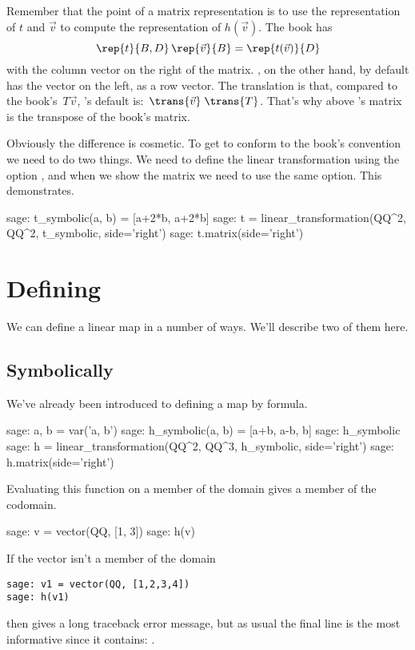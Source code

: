 Remember that the point of a matrix representation is to
use the representation of $t$ and $\vec{v}$ to compute
the representation of $h(\vec{v})$.
The book has
\begin{equation*}
  \rep{t}{B,D}\,\rep{\vec{v}}{B}=\rep{t(\vec{v})}{D}
\end{equation*}
with the column vector on the right of the matrix.
\Sage{}, on the other hand, by default has the vector on the left, as a 
row vector.
The translation is that, compared to the book's~$T\vec{v}$,
\Sage{}'s default is:~$\trans{\vec{v}}\;\trans{T}$.
That's why above \Sage{}'s matrix is the transpose of the book's matrix.

Obviously the difference is cosmetic.
To get \Sage{} to conform to the book's convention we need to do two 
things.
We need to define the linear transformation using the
option , and when we show the
matrix we need to use the same option.
This demonstrates.
\begin{sagecommandline}
sage: t_symbolic(a, b) = [a+2*b, a+2*b]         
sage: t = linear_transformation(QQ^2, QQ^2, t_symbolic, side='right')  
sage: t.matrix(side='right')
\end{sagecommandline}


  

\section{Defining}
We can define a linear map in a number of ways.
We'll describe two of them here.

\subsection{Symbolically}
We've already been introduced to defining a map by formula.
\begin{sagecommandline}
sage: a, b = var('a, b')   
sage: h_symbolic(a, b) = [a+b, a-b, b]         
sage: h_symbolic       
sage: h = linear_transformation(QQ^2, QQ^3, h_symbolic, side='right')
sage: h.matrix(side='right') 
\end{sagecommandline}
Evaluating this function on a member of the domain gives a member
of the codomain. 
\begin{sagecommandline}
sage: v = vector(QQ, [1, 3])  
sage: h(v)
\end{sagecommandline}

If the vector isn't a member of the domain
\begin{lstlisting}
sage: v1 = vector(QQ, [1,2,3,4])
sage: h(v1)
\end{lstlisting}
then \Sage{} gives a long traceback error message, but as usual the final line 
is the most informative since it contains:
.

